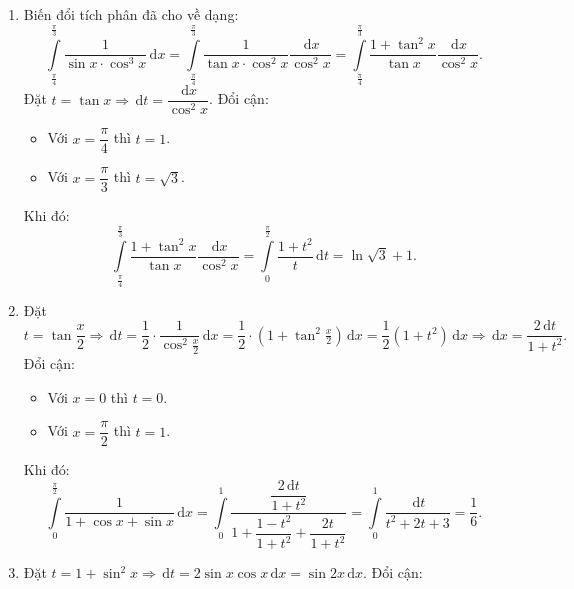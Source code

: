 \begin{bt}
{\begin{enumerate}
				Đặt $t=\sin x \Rightarrow \mathrm{\,d}t=\cos x\mathrm{\,d}x$. Đổi cận:
				\begin{itemize}
					\item Với $x=0$ thì $t=0$.
					\item Với $x=\dfrac{\pi}{2}$ thì $t=1$.
				\end{itemize}
				Khi đó:
				$$\displaystyle\int\limits_0^{\frac{\pi}{2}}(\sin^2 x-\sin^4x)\cdot \cos x\mathrm{\,d}x=\displaystyle\int\limits_0^1\left(t^2-t^4\right)\mathrm{\,d}t=\dfrac{2}{15}.$$
				\item Biến đổi tích phân đã cho về dạng:
				$$\displaystyle\int\limits_{\frac{\pi}{4}}^{\frac{\pi}{3}}\dfrac{1}{\sin x\cdot \cos^3 x}\mathrm{\,d}x=\displaystyle\int\limits_{\frac{\pi}{4}}^{\frac{\pi}{3}}\dfrac{1}{\tan x\cdot \cos^2 x}\dfrac{\mathrm{\,d}x}{\cos^2 x}=\displaystyle\int\limits_{\frac{\pi}{4}}^{\frac{\pi}{3}} \dfrac{1+\tan^2 x}{\tan x}\dfrac{\mathrm{\,d}x}{\cos^2 x}.$$
				Đặt $t=\tan x \Rightarrow \mathrm{\,d}t=\dfrac{\mathrm{\,d}x}{\cos^2 x}$. Đổi cận:
				\begin{itemize}
					\item Với $x=\dfrac{\pi}{4}$ thì $t=1$.
					\item Với $x=\dfrac{\pi}{3}$ thì $t=\sqrt{3}$.
				\end{itemize}
				Khi đó:
				$$\displaystyle\int\limits_{\frac{\pi}{4}}^{\frac{\pi}{3}} \dfrac{1+\tan^2 x}{\tan x}\dfrac{\mathrm{\,d}x}{\cos^2 x}=\displaystyle\int\limits_0^{\frac{\pi}{2}} \dfrac{1+t^2}{t}\mathrm{\,d}t=\ln \sqrt{3}+1.$$
				\item  Đặt $t=\tan \dfrac{x}{2} \Rightarrow \mathrm{\,d}t=\dfrac{1}{2}\cdot \dfrac{1}{\cos^2\frac{x}{2}}\mathrm{\,d}x=\dfrac{1}{2}\cdot \left(1+\tan^2 \frac{x}{2}\right)\mathrm{\,d}x=\dfrac{1}{2}\left(1+t^2\right)\mathrm{\,d}x \Rightarrow \mathrm{\,d}x=\dfrac{2\mathrm{\,d}t}{1+t^2}.$
				Đổi cận:
				\begin{itemize}
					\item Với $x=0$ thì $t=0$.
					\item Với $x=\dfrac{\pi}{2}$ thì $t=1$.
				\end{itemize}
				Khi đó:
				$$\displaystyle\int\limits_0^{\frac{\pi}{2}}\dfrac{1}{1+\cos x+\sin x}\mathrm{\,d}x=\displaystyle\int\limits_0^1 \dfrac{ \dfrac{2\mathrm{\,d}t}{1+t^2}}{1+\dfrac{1-t^2}{1+t^2}+\dfrac{2t}{1+t^2}}=\displaystyle\int\limits_0^1\dfrac{\mathrm{\,d}t}{t^2+2t+3}=\dfrac{1}{6}.$$
				\item Đặt $t=1+\sin^2 x \Rightarrow \mathrm{\,d}t=2\sin x\cos x\mathrm{\,d}x=\sin 2x\mathrm{\,d}x$. Đổi cận:

\end{enumerate}}
\end{bt}
